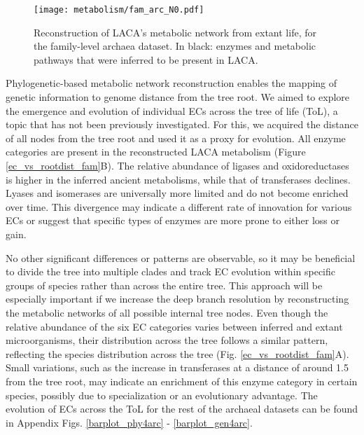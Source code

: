 \begin{figure}[H]
    \centering
    \texttt{[image: metabolism/fam\_arc\_N0.pdf]}
    \caption{Reconstruction of LACA's metabolic network from extant life, for the family-level archaea dataset. In black: enzymes and metabolic pathways that were inferred to be present in LACA.}    
    \label{fam4arc_metnet}
\end{figure}


Phylogenetic-based metabolic network reconstruction enables the mapping of genetic information to genome distance from the tree root. We aimed to explore the emergence and evolution of individual ECs across the tree of life (ToL), a topic that has not been previously investigated. For this, we acquired the distance of all nodes from the tree root and used it as a proxy for evolution. All enzyme categories are present in the reconstructed LACA metabolism (Figure \ref{ec_vs_rootdist_fam}B). The relative abundance of ligases and oxidoreductases is higher in the inferred ancient metabolisms, while that of transferases declines. Lyases and isomerases are universally more limited and do not become enriched over time. This divergence may indicate a different rate of innovation for various ECs or suggest that specific types of enzymes are more prone to either loss or gain.

No other significant differences or patterns are observable, so it may be beneficial to divide the tree into multiple clades and track EC evolution within specific groups of species rather than across the entire tree. This approach will be especially important if we increase the deep branch resolution by reconstructing the metabolic networks of all possible internal tree nodes. Even though the relative abundance of the six EC categories varies between inferred and extant microorganisms, their distribution across the tree follows a similar pattern, reflecting the species distribution across the tree (Fig. \ref{ec_vs_rootdist_fam}A). Small variations, such as the increase in transferases at a distance of around 1.5 from the tree root, may indicate an enrichment of this enzyme category in certain species, possibly due to specialization or an evolutionary advantage. The evolution of ECs across the ToL for the rest of the archaeal datasets can be found in Appendix Figs. \ref{barplot_phy4arc} - \ref{barplot_gen4arc}.

